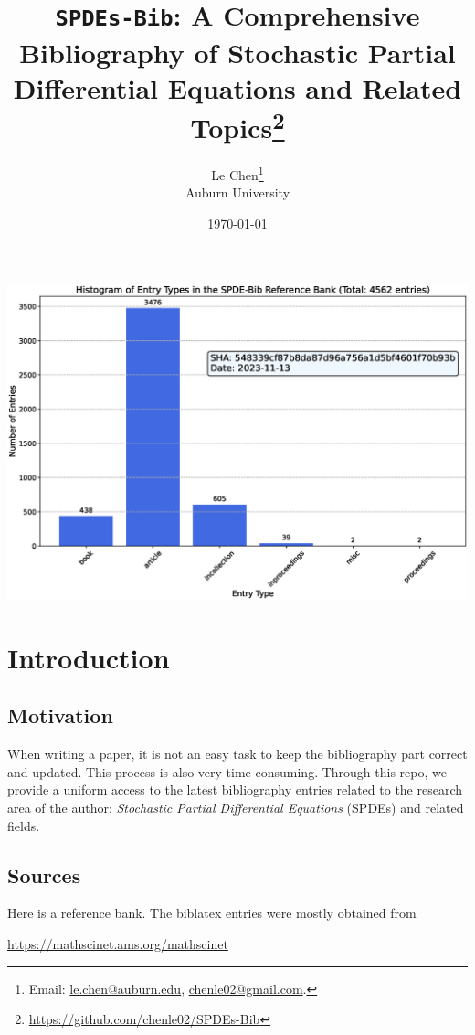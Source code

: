 \documentclass[a4paper,11pt]{article}
\title{\texttt{SPDEs-Bib}: A Comprehensive Bibliography of Stochastic Partial
  Differential Equations and Related Topics\footnote{\url{https://github.com/chenle02/SPDEs-Bib}}}
\author{Le Chen\footnote{Email: \url{le.chen@auburn.edu}, \url{chenle02@gmail.com}.}\\ Auburn University}
\date{\today}
\begin{document}
\maketitle
\tableofcontents
\vfill

\begin{center}
  \includegraphics[scale=0.55]{Statistics.eps}
\end{center}

\newpage

\section{Introduction}

\subsection{Motivation}

When writing a paper, it is not an easy task to keep the bibliography part
correct and updated. This process is also very time-consuming. Through this
repo, we provide a uniform access to the latest bibliography entries related to
the research area of the author: \textit{Stochastic Partial Differential
Equations} (SPDEs) and related fields.


\subsection{Sources}
Here is a reference bank. The biblatex entries were mostly obtained from

\begin{center}
  \url{https://mathscinet.ams.org/mathscinet}
\end{center}
\end{document}
